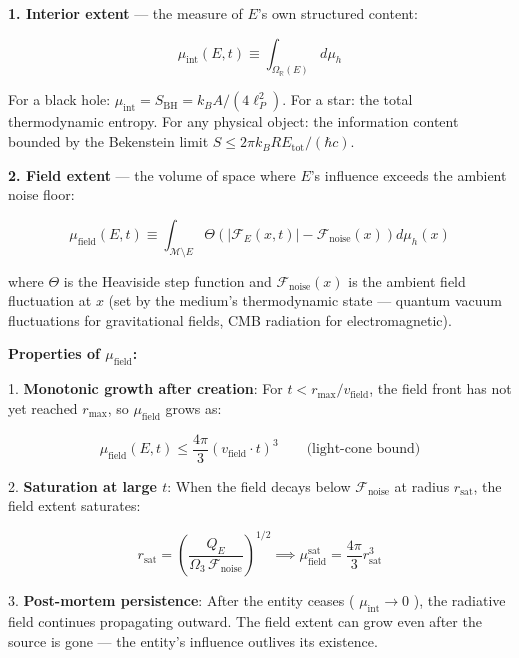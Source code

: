 \documentclass[11pt,a4paper]{article}
\theoremstyle{definition}\newtheorem{definition}{Definition}
\theoremstyle{remark}\newtheorem{remark}{Remark}
\begin{document}
\textbf{1. Interior extent} — the measure of $E$'s own structured content:


\begin{equation}
\mu_{\text{int}}(E, t) \equiv \int_{\Omega_{\mathbb{R}}(E)} d\mu_h
\end{equation}


For a black hole: $\mu_{\text{int}} = S_{\text{BH}} = k_B A / (4 \ell_P^2)$. For a star: the total thermodynamic entropy. For any physical object: the information content bounded by the Bekenstein limit $S \leq 2\pi k_B R E_{\text{tot}} / (\hbar c)$.

\textbf{2. Field extent} — the volume of space where $E$'s influence exceeds the ambient noise floor:


\begin{equation}
\mu_{\text{field}}(E, t) \equiv \int_{\mathcal{M} \setminus E} \Theta\left( |\mathcal{F}_E(x, t)| - \mathcal{F}_{\text{noise}}(x) \right) d\mu_h(x)
\end{equation}


where $\Theta$ is the Heaviside step function and $\mathcal{F}_{\text{noise}}(x)$ is the ambient field fluctuation at $x$ (set by the medium's thermodynamic state — quantum vacuum fluctuations for gravitational fields, CMB radiation for electromagnetic).

\textbf{Properties of $\mu_{\text{field}}$:}

1. \textbf{Monotonic growth after creation}: For $t < r_{\text{max}} / v_{\text{field}}$, the field front has not yet reached $r_{\text{max}}$, so $\mu_{\text{field}}$ grows as:


\begin{equation}
\mu_{\text{field}}(E, t) \leq \frac{4\pi}{3}(v_{\text{field}} \cdot t)^3 \qquad \text{(light-cone bound)}
\end{equation}


2. \textbf{Saturation at large $t$}: When the field decays below $\mathcal{F}_{\text{noise}}$ at radius $r_{\text{sat}}$, the field extent saturates:


\begin{equation}
r_{\text{sat}} = \left( \frac{Q_E}{\Omega_3 \, \mathcal{F}_{\text{noise}}} \right)^{1/2} \implies \mu_{\text{field}}^{\text{sat}} = \frac{4\pi}{3} r_{\text{sat}}^3
\end{equation}


3. \textbf{Post-mortem persistence}: After the entity ceases ( $\mu_{\text{int}} \to 0$ ), the radiative field continues propagating outward. The field extent can grow even after the source is gone — the entity's influence outlives its existence.
\end{document}
